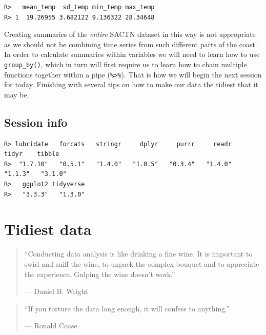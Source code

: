 \documentclass[
]{book}
\newenvironment{Shaded}{\begin{snugshade}}{\end{snugshade}}
\newcommand{\FunctionTok}[1]{\textcolor[rgb]{0.00,0.00,0.00}{#1}}
\newcommand{\NormalTok}[1]{#1}
\newcommand{\SpecialCharTok}[1]{\textcolor[rgb]{0.00,0.00,0.00}{#1}}
\newcommand{\StringTok}[1]{\textcolor[rgb]{0.31,0.60,0.02}{#1}}
\begin{document}
\begin{verbatim}
R>   mean_temp  sd_temp min_temp max_temp
R> 1  19.26955 3.682122 9.136322 28.34648
\end{verbatim}

Creating summaries of the \emph{entire} SACTN dataset in this way is not appropriate as we should not be combining time series from such different parts of the coast. In order to calculate summaries within variables we will need to learn how to use \texttt{group\_by()}, which in turn will first require us to learn how to chain multiple functions together within a pipe (\texttt{\%\textgreater{}\%}). That is how we will begin the next session for today. Finishing with several tips on how to make our data the tidiest that it may be.

\hypertarget{session-info-9}{%
\section{Session info}\label{session-info-9}}

\begin{Shaded}
\end{Shaded}

\begin{verbatim}
R> lubridate   forcats   stringr     dplyr     purrr     readr     tidyr    tibble 
R>  "1.7.10"   "0.5.1"   "1.4.0"   "1.0.5"   "0.3.4"   "1.4.0"   "1.1.3"   "3.1.0" 
R>   ggplot2 tidyverse 
R>   "3.3.3"   "1.3.0"
\end{verbatim}

\hypertarget{tidiest}{%
\chapter{Tidiest data}\label{tidiest}}

\begin{quote}
``Conducting data analysis is like drinking a fine wine. It is important to swirl and sniff the wine, to unpack the complex bouquet and to appreciate the experience. Gulping the wine doesn't work.''

--- Daniel B. Wright
\end{quote}

\begin{quote}
``If you torture the data long enough, it will confess to anything.''

--- Ronald Coase
\end{quote}
\end{document}
